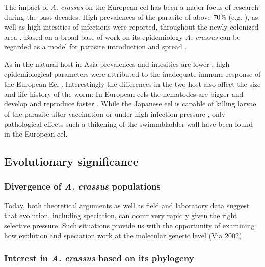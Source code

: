 The impact of \textit{A. crassus} on the European eel has been a major
focus of research during the past decades. High prevalences of the
parasite of above 70\% (e.g. \cite{wrtz_distribution_1998}), as well
as high intesities of infections were reported, throughout the newly
colonized area \cite{lefebvre_anguillicolosis:_2004}.  Based on a
broad base of work on its epidemiology \textit{A. crassus} can be
regarded as a model for parasite introduction and spread
\cite{taraschewski_hosts_2007}.

As in the natural host in Asia prevalences and intesities are lower
\cite{mnderle_occurrence_2006}, high epidemiological parameters were
attributed to the inadequate immune-response of the European Eel
\cite{knopf_swimbladder_2006}. Interestingly the differences in the
two host also affect the size and life-history of the worm: In
European eels the nematodes are bigger and develop and reproduce
faster \cite{knopf_differences_2004}.  While the Japanese eel is
capable of killing larvae of the parasite after vaccination
\cite{knopf_vaccination_2008} or under high infection pressure
\cite{heitlinger_massive_2009}, only pathological effects such a
thikening of the swimmbladder wall \cite{wrtz_histopathological_2000}
have been found in the European eel.



\subsection{Evolutionary significance}

\subsubsection{Divergence of \textit{A. crassus} populations}


Today, both theoretical arguments as well as field and laboratory data
suggest that evolution, including speciation, can occur very rapidly
given the right selective pressure. Such situations provide us with
the opportunity of examining how evolution and speciation work at the
molecular genetic level (Via 2002).


\subsubsection{Interest in \textit{A. crassus} based on its
    phylogeny}


